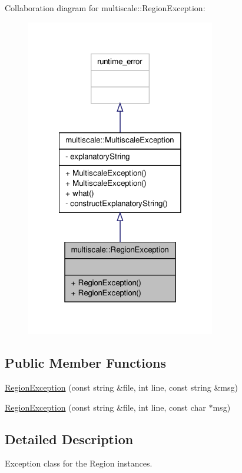 Collaboration diagram for multiscale\-:\-:Region\-Exception\-:\nopagebreak
\begin{figure}[H]
\begin{center}
\leavevmode
\includegraphics[width=234pt]{classmultiscale_1_1RegionException__coll__graph}
\end{center}
\end{figure}
\subsection*{Public Member Functions}
\begin{DoxyCompactItemize}
\item 
\hyperlink{classmultiscale_1_1RegionException_a10febb34060369b6d579cd8ce1958133}{Region\-Exception} (const string \&file, int line, const string \&msg)
\item 
\hyperlink{classmultiscale_1_1RegionException_a2be955d2fe444a4a4f2567d7a6599a9b}{Region\-Exception} (const string \&file, int line, const char $\ast$msg)
\end{DoxyCompactItemize}


\subsection{Detailed Description}
Exception class for the Region instances. 

